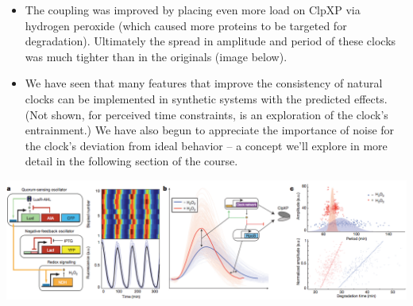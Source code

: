 \documentclass{article}
\begin{document}
\begin{itemize}
\item The coupling was improved by placing even more load on ClpXP via hydrogen peroxide (which caused more proteins to be targeted for degradation). Ultimately the spread in amplitude and period of these clocks was much tighter than in the originals (image below).
\item We have seen that many features that improve the consistency of natural clocks can be implemented in synthetic systems with the predicted effects. (Not shown, for perceived time constraints, is an exploration of the clock's entrainment.) We have also begun to appreciate the importance of noise for the clock's deviation from ideal behavior -- a concept we'll explore in more detail in the following section of the course.
\end{itemize}
\begin{center}
\includegraphics[width=\textwidth]{prindle_h2o2.png}
\end{center}
\end{document}
